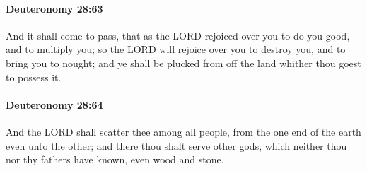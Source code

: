 		\paragraph{Deuteronomy 28:63} %
			\label{DEUTERONOMY-28-63}

			And it shall come to pass, that as the LORD rejoiced over you to do you good, and to multiply you; so the LORD will rejoice over you to destroy you, and to bring you to nought; and ye shall be plucked from off the land whither thou goest to possess it.


		\paragraph{Deuteronomy 28:64} %
			\label{DEUTERONOMY-28-64}

			And the LORD shall scatter thee among all people, from the one end of the earth even unto the other; and there thou shalt serve other gods, which neither thou nor thy fathers have known, even wood and stone.

